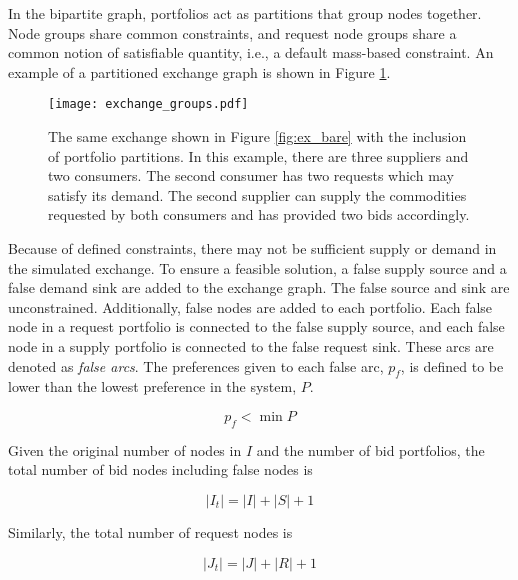 In the bipartite graph, portfolios act as partitions that group nodes
together. Node groups share common constraints, and request node groups share a
common notion of satisfiable quantity, i.e., a default mass-based constraint. An
example of a partitioned exchange graph is shown in Figure \ref{fig:ex_groups}.

\begin{figure}
  \begin{center}
    \texttt{[image: exchange\_groups.pdf]}
    \caption{The same exchange shown in Figure \ref{fig:ex_bare} with the
      inclusion of portfolio partitions. In this example, there are three
      suppliers and two consumers. The second consumer has two requests which
      may satisfy its demand. The second supplier can supply the commodities
      requested by both consumers and has provided two bids accordingly.}
    \label{fig:ex_groups}
  \end{center}
\end{figure}

Because of defined constraints, there may not be sufficient supply or demand in
the simulated exchange. To ensure a feasible solution, a false supply source and
a false demand sink are added to the exchange graph. The false source and sink
are unconstrained. Additionally, false nodes are added to each portfolio. Each
false node in a request portfolio is connected to the false supply source, and
each false node in a supply portfolio is connected to the false request
sink. These arcs are denoted as \textit{false arcs}. The preferences given to
each false arc, $p_f$, is defined to be lower than the lowest preference in the
system, $P$.

\begin{equation}\label{eqn:falsepref}
  p_{f} < \min P
\end{equation}

Given the original number of nodes in $I$ and the number of bid portfolios, the
total number of bid nodes including false nodes is

\begin{equation}
  \left|{I_t}\right| = \left|{I}\right| + \left|{S}\right| + 1
\end{equation}

Similarly, the total number of request nodes is

\begin{equation}
  \left|{J_t}\right| = \left|{J}\right| + \left|{R}\right| + 1
\end{equation}

